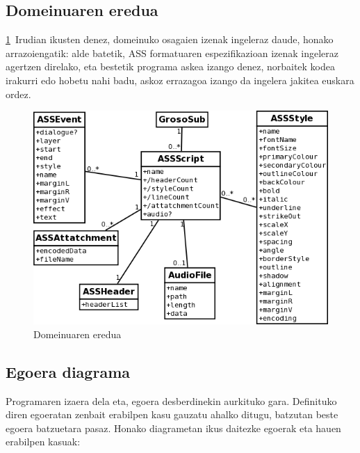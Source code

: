 \subsection{Domeinuaren eredua}
\ref{de}~Irudian ikusten denez, domeinuko osagaien izenak ingeleraz daude, honako arrazoiengatik: alde batetik, ASS formatuaren espezifikazioan izenak ingeleraz agertzen direlako\cite{gu:ass}, eta bestetik programa askea izango denez, norbaitek kodea irakurri edo hobetu nahi badu, askoz errazagoa izango da ingelera jakitea euskara ordez.
\begin{figure}[htp]
\begin{center}
\includegraphics[scale=0.6]{Pictures/Chapter4/Analisia/DE.png}
\caption{Domeinuaren eredua}
\label{de}
\end{center}
\end{figure}

\subsection{Egoera diagrama}
Programaren izaera dela eta, egoera desberdinekin aurkituko gara. Definituko diren egoeratan zenbait erabilpen kasu gauzatu ahalko ditugu, batzutan beste egoera batzuetara pasaz. Honako diagrametan ikus daitezke egoerak eta hauen erabilpen kasuak:


